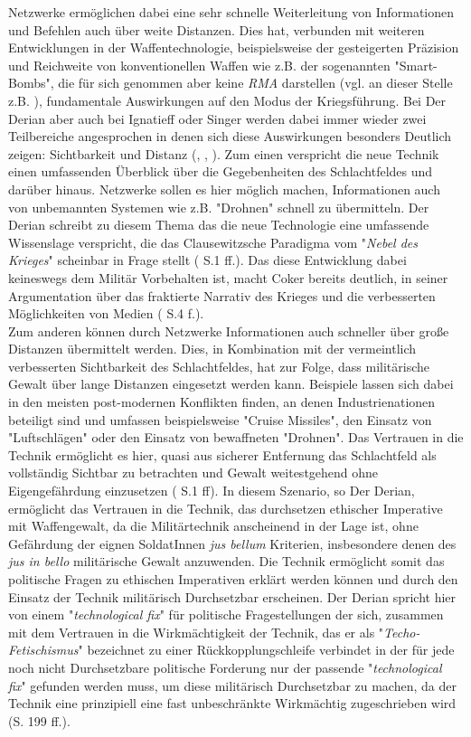 \documentclass[11pt,a4paper,oneside,numbers=noenddot,bibliography=totocnumbered,DIV=13]{scrartcl}
\begin{document}
Netzwerke ermöglichen dabei eine sehr schnelle Weiterleitung von Informationen und Befehlen auch über weite Distanzen.
Dies hat, verbunden mit weiteren Entwicklungen in der Waffentechnologie, beispielsweise der gesteigerten Präzision und Reichweite von konventionellen Waffen wie z.B. der sogenannten "Smart-Bombs", die für sich genommen aber keine \textit{RMA} darstellen (vgl. an dieser Stelle z.B. \cite{ignatieff_virtual_2000}), fundamentale Auswirkungen auf den Modus der Kriegsführung. 
Bei Der Derian aber auch bei Ignatieff oder Singer werden dabei immer wieder zwei Teilbereiche angesprochen in denen sich diese Auswirkungen besonders Deutlich zeigen: Sichtbarkeit und Distanz (\cite{DerDerian2001}, \cite{ignatieff_virtual_2000}, \cite{singer_wired_2010}). 
Zum einen verspricht die neue Technik einen umfassenden Überblick über die Gegebenheiten des Schlachtfeldes und darüber hinaus. 
Netzwerke sollen es hier möglich machen, Informationen auch von unbemannten Systemen wie z.B. "Drohnen" schnell zu übermitteln. 
Der Derian schreibt zu diesem Thema das die neue Technologie eine umfassende Wissenslage verspricht, die das Clausewitzsche Paradigma vom "\textit{Nebel des Krieges}" scheinbar in Frage stellt (\cite{DerDerian2001} S.1 ff.).
Das diese Entwicklung dabei keineswegs dem Militär Vorbehalten ist, macht Coker bereits deutlich, in seiner Argumentation über das fraktierte Narrativ des Krieges und die verbesserten Möglichkeiten von Medien (\cite{coker_collision_2012} S.4 f.). \\
Zum anderen können durch Netzwerke Informationen auch schneller über große Distanzen übermittelt werden. 
Dies, in Kombination mit der vermeintlich verbesserten Sichtbarkeit des Schlachtfeldes, hat zur Folge, dass militärische Gewalt über lange Distanzen eingesetzt werden kann. 
Beispiele lassen sich dabei in den meisten post-modernen Konflikten finden, an denen Industrienationen beteiligt sind und umfassen beispielsweise "Cruise Missiles", den Einsatz von "Luftschlägen" oder den Einsatz von bewaffneten "Drohnen". 
Das Vertrauen in die Technik ermöglicht es hier, quasi aus sicherer Entfernung das Schlachtfeld als vollständig Sichtbar zu betrachten und Gewalt weitestgehend ohne Eigengefährdung einzusetzen (\cite{DerDerian2001} S.1 ff).
In diesem Szenario, so Der Derian, ermöglicht das Vertrauen in die Technik, das durchsetzen ethischer Imperative mit Waffengewalt, da die Militärtechnik anscheinend in der Lage ist, ohne Gefährdung der eignen SoldatInnen \textit{jus bellum} Kriterien, insbesondere denen des \textit{jus in bello} militärische Gewalt anzuwenden. 
Die Technik ermöglicht somit das politische Fragen zu ethischen Imperativen erklärt werden können und durch den Einsatz der Technik militärisch Durchsetzbar erscheinen. 
Der Derian spricht hier von einem "\textit{technological fix}" für politische Fragestellungen der sich, zusammen mit dem Vertrauen in die Wirkmächtigkeit der Technik, das er als "\textit{Techo-Fetischismus}" bezeichnet zu einer Rückkopplungschleife verbindet in der für jede noch nicht Durchsetzbare politische Forderung nur der passende "\textit{technological fix}" gefunden werden muss, um diese militärisch Durchsetzbar zu machen, da der Technik eine prinzipiell eine fast unbeschränkte Wirkmächtig zugeschrieben wird (\cite{DerDerian2001}S. 199 ff.).
\end{document}
